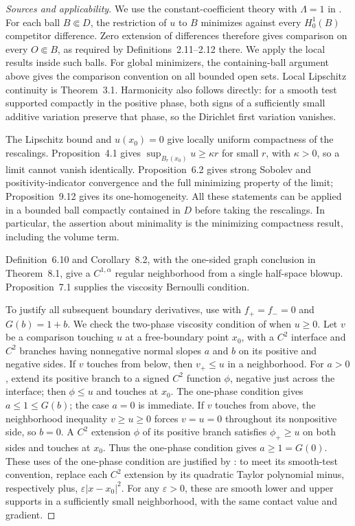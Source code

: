\begin{proof}[Sources and applicability]
We use the constant-coefficient theory with $\Lambda=1$ in
\cite{Velichkov2023}.  For each ball $B\Subset D$, the restriction of $u$
to $B$ minimizes against every $H^1_0(B)$ competitor difference.
Zero extension of differences therefore gives comparison on every
$O\Subset B$, as required by Definitions~2.11--2.12 there. We apply the
local results inside such balls. For global minimizers, the containing-ball
argument above gives the comparison convention on all bounded open sets.
Local Lipschitz continuity is Theorem~3.1. Harmonicity also follows
directly: for a smooth test supported compactly in the positive phase, both
signs of a sufficiently small additive variation preserve that phase, so the
Dirichlet first variation vanishes.

The Lipschitz bound and $u(x_0)=0$ give locally uniform compactness of the
rescalings.  Proposition~4.1 gives
$\sup_{B_r(x_0)}u\geq\kappa r$ for small $r$, with $\kappa>0$, so a limit
cannot vanish identically.  Proposition~6.2 gives strong Sobolev and
positivity-indicator convergence and the full minimizing property of the
limit; Proposition~9.12 gives its one-homogeneity.  All these statements can
be applied in a bounded ball compactly contained in $D$ before taking the
rescalings.  In particular, the assertion about minimality is the minimizing
compactness result, including the volume term.

Definition~6.10 and Corollary~8.2, with the one-sided graph conclusion in
Theorem~8.1, give a $C^{1,\alpha}$ regular neighborhood from a single
half-space blowup.  Proposition~7.1 supplies the viscosity Bernoulli condition.

To justify all subsequent boundary derivatives, use
\cite[Theorem~1.1 and Corollary~1.2]{DeSilvaFerrariSalsa2019} with
$f_+=f_-=0$ and $G(b)=1+b$.  We check the two-phase viscosity condition
of \cite[Definition~7.1]{DeSilvaFerrariSalsa2014} when $u\geq0$.
Let $v$ be a comparison touching $u$ at a free-boundary
point $x_0$, with a $C^2$ interface and $C^2$ branches having nonnegative
normal slopes $a$ and $b$ on its positive and negative sides.  If $v$ touches
from below, then $v_+\leq u$ in a neighborhood.  For $a>0$, extend its
positive branch to a signed $C^2$ function $\phi$, negative just across
the interface; then $\phi\leq u$ and touches at $x_0$.  The one-phase
condition gives $a\leq1\leq G(b)$; the case $a=0$ is immediate.  If $v$
touches from above, the neighborhood inequality $v\geq u\geq0$ forces
$v=u=0$ throughout its nonpositive side, so $b=0$.  A $C^2$ extension
$\phi$ of its positive branch satisfies $\phi_+\geq u$ on both sides
and touches at $x_0$.  Thus the one-phase condition gives $a\geq1=G(0)$.
These uses of the one-phase condition are justified by
\cite[Definition~7.6 and Proposition~7.1]{Velichkov2023}: to meet its
smooth-test convention, replace each $C^2$ extension by its quadratic
Taylor polynomial minus, respectively plus, $\varepsilon|x-x_0|^2$.
For any $\varepsilon>0$, these are smooth lower and upper supports in a
sufficiently small neighborhood, with the same contact value and gradient.


\end{proof}
